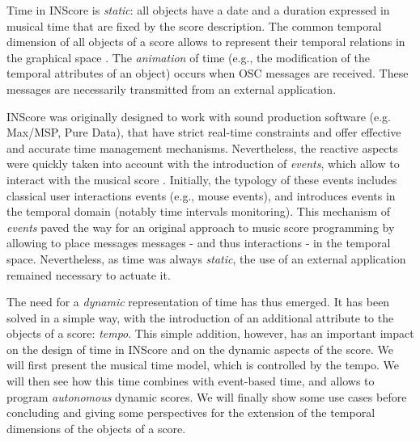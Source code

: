 \documentclass{article}
\begin{document}
Time in INScore \cite{Fober:12a} is \emph{static}: all objects have a date and 
a duration expressed in musical time that are fixed by the score description. The common temporal dimension of all objects of a score allows to represent their temporal relations in the graphical space \cite{fober:10b}. The \emph{animation} 
of time (e.g., the modification of the temporal attributes of an object) occurs 
 when OSC messages are received. These messages are necessarily transmitted from an external application.

INScore was originally designed to work with sound production software (e.g. Max/MSP, Pure Data), that have strict real-time constraints and offer effective and accurate time management mechanisms. Nevertheless, the reactive aspects were quickly taken into account with the introduction of \textit{events}, which allow to interact with the 
musical score \cite{Fober:13b}. Initially, the typology of these events includes classical user interactions events (e.g., mouse events), and introduces events in the temporal domain (notably time intervals monitoring). This mechanism of \textit{events} paved the way for an original approach to music score programming by 
allowing to place messages messages - and thus interactions - in the temporal space. Nevertheless, as time was always \emph{static}, the use of an external application remained necessary to actuate it.

The need for a \emph{dynamic} representation of time has thus emerged. It has been solved in a simple way, with the introduction of an additional attribute to the objects of a %
score: \emph{tempo}. This simple addition, however, has an important impact on the design of 
time in INScore and on the dynamic aspects of the score. We will first present the musical time model, which is controlled by the tempo. We will then see how this time combines with event-based time, and allows to program \emph{autonomous} dynamic scores. We will finally show some use cases before concluding and giving some perspectives for the extension of the temporal dimensions of the objects of a score.
\end{document}
